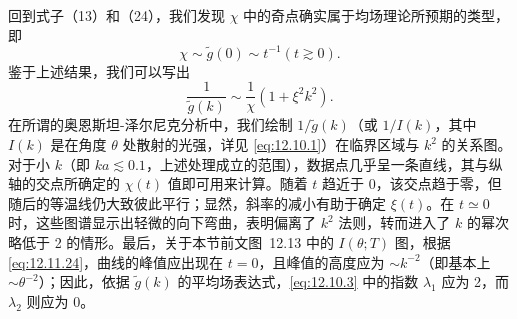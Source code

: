 回到式子（13）和（24），我们发现 \(\chi\) 中的奇点确实属于均场理论所预期的类型，即
\begin{equation}\tag{12.11.35}\label{eq:12.11.35}
\chi \sim \tilde { g } ( 0 ) \sim t ^{- 1}  ( t \gtrsim 0 ) .
\end{equation}
鉴于上述结果，我们可以写出
\begin{equation}\tag{12.11.36}\label{eq:12.11.36}
\frac { 1 } { \tilde { g } ( k ) } \sim \frac { 1 } { \chi } ( 1 + \xi ^{2} k ^{2} ) .
\end{equation}
在所谓的奥恩斯坦-泽尔尼克分析中，我们绘制 \(1/\tilde{g}(k)\)（或 \(1/I(k)\)，其中 \(I(k)\) 是在角度 \(\theta\) 处散射的光强，详见 \autoref{eq:12.10.1}）在临界区域与 \(k^2\) 的关系图。对于小 \(k\)（即 \(ka \lesssim 0.1\)，上述处理成立的范围），数据点几乎呈一条直线，其与纵轴的交点所确定的 \(\chi(t)\) 值即可用来计算。随着 \(t\) 趋近于 0，该交点趋于零，但随后的等温线仍大致彼此平行；显然，斜率的减小有助于确定 \(\xi(t)\)。在 \(t \simeq 0\) 时，这些图谱显示出轻微的向下弯曲，表明偏离了 \(k^2\) 法则，转而进入了 \(k\) 的幂次略低于 2 的情形。最后，关于本节前文图~12.13 中的 \(I(\theta;T)\) 图，根据 \autoref{eq:12.11.24}，曲线的峰值应出现在 \(t=0\)，且峰值的高度应为 \(\sim k^{-2}\)（即基本上 \(\sim \theta^{-2}\)）；因此，依据 \(\tilde{g}(k)\) 的平均场表达式，\autoref{eq:12.10.3} 中的指数 \(\lambda_1\) 应为 2，而 \(\lambda_2\) 则应为 0。
